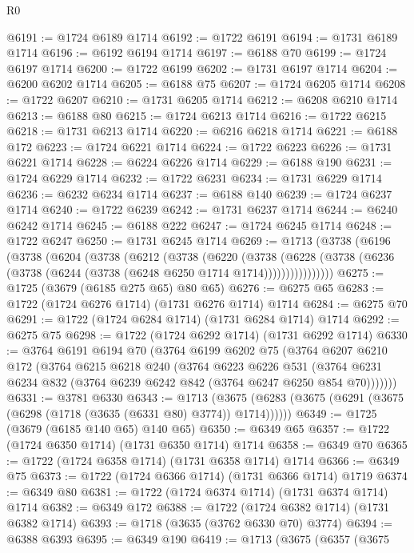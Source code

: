 \begin{lexlean}{R0}
\begin{coremodule}
@6191 := @1724 @6189 @1714
@6192 := @1722 @6191
@6194 := @1731 @6189 @1714
@6196 := @6192 @6194 @1714
@6197 := @6188 @70
@6199 := @1724 @6197 @1714
@6200 := @1722 @6199
@6202 := @1731 @6197 @1714
@6204 := @6200 @6202 @1714
@6205 := @6188 @75
@6207 := @1724 @6205 @1714
@6208 := @1722 @6207
@6210 := @1731 @6205 @1714
@6212 := @6208 @6210 @1714
@6213 := @6188 @80
@6215 := @1724 @6213 @1714
@6216 := @1722 @6215
@6218 := @1731 @6213 @1714
@6220 := @6216 @6218 @1714
@6221 := @6188 @172
@6223 := @1724 @6221 @1714
@6224 := @1722 @6223
@6226 := @1731 @6221 @1714
@6228 := @6224 @6226 @1714
@6229 := @6188 @190
@6231 := @1724 @6229 @1714
@6232 := @1722 @6231
@6234 := @1731 @6229 @1714
@6236 := @6232 @6234 @1714
@6237 := @6188 @140
@6239 := @1724 @6237 @1714
@6240 := @1722 @6239
@6242 := @1731 @6237 @1714
@6244 := @6240 @6242 @1714
@6245 := @6188 @222
@6247 := @1724 @6245 @1714
@6248 := @1722 @6247
@6250 := @1731 @6245 @1714
@6269 := @1713
    (@3738
      (@6196
        (@3738
          (@6204
            (@3738
              (@6212
                (@3738
                  (@6220
                    (@3738
                      (@6228
                        (@3738 (@6236 (@3738 (@6244 (@3738 (@6248 @6250 @1714 @1714))))))))))))))))
@6275 := @1725 (@3679 (@6185 @275 @65) @80 @65)
@6276 := @6275 @65
@6283 := @1722 (@1724 @6276 @1714) (@1731 @6276 @1714) @1714
@6284 := @6275 @70
@6291 := @1722 (@1724 @6284 @1714) (@1731 @6284 @1714) @1714
@6292 := @6275 @75
@6298 := @1722 (@1724 @6292 @1714) (@1731 @6292 @1714)
@6330 := @3764
    @6191
    @6194
    @70
    (@3764
      @6199
      @6202
      @75
      (@3764
        @6207
        @6210
        @172
        (@3764
          @6215
          @6218
          @240
          (@3764
            @6223
            @6226
            @531
            (@3764 @6231 @6234 @832 (@3764 @6239 @6242 @842 (@3764 @6247 @6250 @854 @70)))))))
@6331 := @3781 @6330
@6343 := @1713
    (@3675 (@6283 (@3675 (@6291 (@3675 (@6298 (@1718 (@3635 (@6331 @80) @3774)) @1714))))))
@6349 := @1725 (@3679 (@6185 @140 @65) @140 @65)
@6350 := @6349 @65
@6357 := @1722 (@1724 @6350 @1714) (@1731 @6350 @1714) @1714
@6358 := @6349 @70
@6365 := @1722 (@1724 @6358 @1714) (@1731 @6358 @1714) @1714
@6366 := @6349 @75
@6373 := @1722 (@1724 @6366 @1714) (@1731 @6366 @1714) @1719
@6374 := @6349 @80
@6381 := @1722 (@1724 @6374 @1714) (@1731 @6374 @1714) @1714
@6382 := @6349 @172
@6388 := @1722 (@1724 @6382 @1714) (@1731 @6382 @1714)
@6393 := @1718 (@3635 (@3762 @6330 @70) @3774)
@6394 := @6388 @6393
@6395 := @6349 @190
@6419 := @1713
    (@3675
      (@6357
        (@3675

\end{coremodule}
\end{lexlean}
